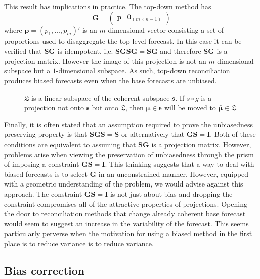 \documentclass[12pt]{article}
\theoremstyle{definition}
\theoremstyle{property}
\begin{document}
	This result has implications in practice. The top-down method \citep{Gross1990} has
	\begin{equation}\label{eq:top-downG}
	\bm{G}=\begin{pmatrix}
	\bm{p} & \bm{0}_{(m \times n-1)}
	\end{pmatrix}
	\end{equation}
    where $\bm{p} = (p_1,\dots,p_m)'$ is an $m$-dimensional vector consisting a set of proportions used to disaggregate the top-level forecast.  In this case it can be verified that $\bm{SG}$ is idempotent, i,e. $\bm{SGSG}=\bm{SG}$ and therefore $\bm{SG}$ is a projection matrix.  However the image of this projection is not an $m$-dimensional subspace but a $1$-dimensional subspace.  As such, top-down reconciliation produces biased forecasts even when the base forecasts are unbiased.
		
	\begin{figure}[H]
		\centering
		\vspace{-0.9cm}
		\small
		\resizebox{\linewidth}{!}{
			
		}
		\caption{$\mathfrak{L}$ is a linear subspace of the coherent subspace $\mathfrak{s}$. If $s\circ g$ is a projection not onto $\mathfrak{s}$ but onto $\mathfrak{L}$, then $\bm{\mu} \in \mathfrak{s}$ will be moved to $\bar{\bm{\mu}} \in \mathfrak{L}$.}\label{fig:Schematic_3D}
	\end{figure}
	
	Finally, it is often stated that an assumption required to prove the unbiasedness preserving property is that $\bm{SGS}=\bm{S}$ or alternatively that $\bm{GS}=\bm{I}$.  Both of these conditions are equivalent to assuming that $\bm{SG}$ is a projection matrix. However, problems arise when viewing the preservation of unbiasedness through the prism of imposing a constraint $\bm{GS}=\bm{I}$. This thinking suggests that a way to deal with biased forecasts is to select $\bm{G}$ in an unconstrained manner.  However, equipped with a geometric understanding of the problem, we would advise against this approach.  The constraint $\bm{GS}=\bm{I}$  is not just about bias and dropping the constraint compromises all of the attractive properties of projections.  Opening the door to reconciliation methods that change already coherent base forecast would seem to suggest an increase in the variability of the forecast.  This seems particularly perverse when the motivation for using a biased method in the first place is to reduce variance is to reduce variance.

    \subsection{Bias correction}
	
\end{document}

